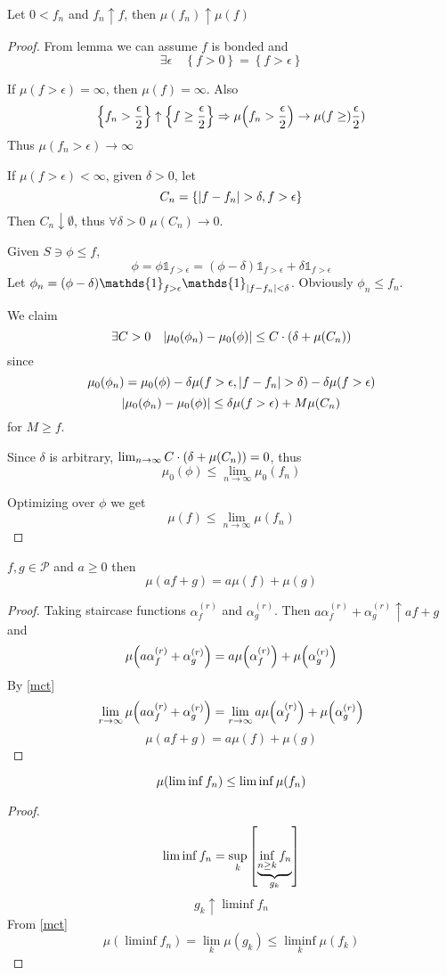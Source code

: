 \begin{theorem} \label{mct}
	Let $0<f_n$ and $f_n\uparrow f$, then $\mu(f_n) \uparrow \mu(f)$
	
	\begin{proof}
		From lemma we can assume $f$ is bonded and 
		$$\exists \epsilon \quad \left\{ f>0\right\}=\left\{ f>\epsilon\right\}$$
		
		If $\mu(f>\epsilon) = \infty$, then $\mu(f) = \infty$. Also
		$$\left\{ f_n > \frac{\epsilon}{2} \right\} \uparrow \left\{ f \geq \frac{\epsilon}{2} \right\} \Rightarrow \mu\qty(f_n > \frac{\epsilon}{2}) \to \mu\qty(f\geq)\frac{\epsilon}{2})$$
		Thus $\mu(f_n>\epsilon) \to \infty$
		
		If $\mu(f>\epsilon) < \infty$, given $\delta>0$, let
		$$C_n = \left\{ \abs{f-f_n} > \delta, f>\epsilon \right\}$$
		Then $C_n \downarrow \emptyset$, thus $\forall \delta>0$ $\mu(C_n) \to 0$.
		
		Given $S \ni \phi \leq f$, $$\phi = \phi \mathds{1}_{f>\epsilon} = (\phi-\delta) \mathds{1}_{f>\epsilon} + \delta \mathds{1}_{f>\epsilon}$$
		Let $\phi_n = (\phi-\delta) \mathds{1}_{f>\epsilon}\mathds{1}_{\abs{f-f_n}<\delta}$. Obviously $\phi_n\leq f_n$.
		
		We claim
		$$\exists C>0 \quad \abs{\mu_0(\phi_n) - \mu_0(\phi)} \leq C\cdot \qty(\delta + \mu(C_n))$$
		since
		$$\mu_0(\phi_n) = \mu_0(\phi) - \delta\mu\qty(f>\epsilon, \abs{f-f_n}>\delta) - \delta \mu(f>\epsilon)$$
		$$\abs{\mu_0(\phi_n) - \mu_0(\phi)} \leq \delta \mu(f>\epsilon) + M\mu(C_n)$$
		for $M\geq f$.
		
		Since $\delta$ is arbitrary, $\lim_{n\to \infty} C\cdot \qty(\delta + \mu(C_n)) = 0$, thus
		$$\mu_0(\phi) \leq \lim_{n\to \infty} \mu_0(f_n) $$
		
		Optimizing over $\phi$ we get
		$$\mu(f) \leq \lim_{n\to \infty} \mu(f_n)$$
	\end{proof}
\begin{coll}
	$f,g\in \mathcal{P}$ and $a\geq 0$ then
	$$\mu(af+g) = a\mu(f)+\mu(g)$$
	\begin{proof}
		Taking staircase functions $\alpha^{(r)}_f$ and $\alpha^{(r)}_g$. Then $a\alpha^{(r)}_f+ \alpha^{(r)}_g \uparrow af+g$ and
		$$\mu\qty(a\alpha^{(r)}_f+ \alpha^{(r)}_g) = a\mu\qty(\alpha^{(r)}_f) + \mu\qty(\alpha^{(r)}_g)$$
		By \ref{mct}
		$$\lim_{r\to \infty} \mu\qty(a\alpha^{(r)}_f+ \alpha^{(r)}_g) = \lim_{r\to \infty}  a\mu\qty(\alpha^{(r)}_f) + \mu\qty(\alpha^{(r)}_g)$$
		$$\mu(af+g) = a\mu(f)+\mu(g)$$
	\end{proof}
\end{coll}
\begin{coll}
$$\mu\qty(\liminf f_n) \leq \liminf \mu(f_n)$$
\begin{proof}
	$$\liminf f_n = \sup\limits_k \qty[\underbrace{\inf\limits_{n\geq k} f_n}_{g_k}] $$
	$$g_k \uparrow \liminf f_n$$
	From \ref{mct}
	$$\mu(\liminf f_n) = \lim_{k} \mu(g_k) \leq \liminf_k \mu(f_k)$$
\end{proof}
\end{coll}
\end{theorem}